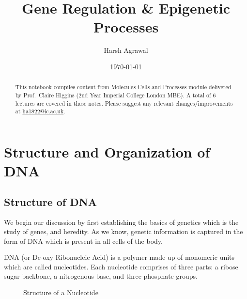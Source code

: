 \documentclass[letterpaper,12pt]{article}
\begin{document}
\title{Gene Regulation \& Epigenetic Processes}
\author{Harsh Agrawal}
\date{\today}
\maketitle

\begin{abstract}
	This notebook compiles content from Molecules Cells and Processes module delivered by Prof.\ Claire Higgins (2nd Year Imperial College London MBE). A total of 6 lectures are covered in these notes. Please suggest any relevant changes/improvements at \href{ha1822@ic.ac.uk}{ha1822@ic.ac.uk}.
\end{abstract}

\tableofcontents
\newpage
\section{Structure and Organization of DNA}
\subsection{Structure of DNA}
We begin our discussion by first establishing the basics of genetics which is the study of genes, and heredity. As we know, genetic information is captured in the form of DNA which is present in all cells of the body.

DNA (or De-oxy Ribonucleic Acid) is a polymer made up of monomeric units which are called nucleotides. Each nucleotide comprises of three parts: a ribose sugar backbone, a nitrogenous base, and three phosphate groups.\ \vspace{.5cm}

\begin{figure}[!h]
	\centering
	\caption{Structure of a Nucleotide}
\end{figure}
\end{document}
